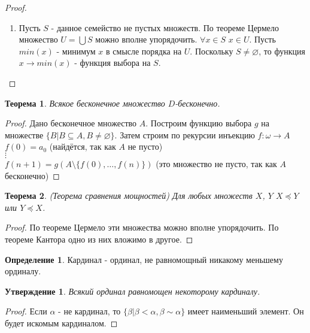 \documentclass[a4paper, 12pt]{article}
\theoremstyle{definition}
\newtheorem*{definition}{Определение}
\theoremstyle{plain}
\newtheorem*{theorem}{Теорема}
\newtheorem*{subtheorem}{Утверждение}
\theoremstyle{remark}
\begin{document}
\begin{proof}
\begin{enumerate}
      По лемме Цорна в $(W(X),\prec)$ найдётся максимальный элемент $(M,\leqslant_M)$. Если $M$ не совпадает с $X$, то возьмём $a\in X\setminus M$ и продолжим порядок $\leqslant_M$ на множество $N=M\cup\{a\}$, полагая $x\leqslant_N a$ $\forall x\in M$. Тогда $(N,\leqslant_N)$ - вполнеупорядоченное подмножество $X$ и $(M,\leqslant_M)\prec(N,\leqslant_N)$, что противоречит максимальности $(M\leqslant_M)$. Значит, $M$ совпадает с $X$ и $M$ вполне упорядочено. Теорема Цермело доказана.
      \item Пусть $S$ - данное семейство не пустых множеств. По теореме Цермело множество $U=\bigcup S$ можно вполне упорядочить. $\forall x\in S$ $x\in U$. Пусть $min(x)$ - минимум $x$ в смысле порядка на $U$. Поскольку $S\neq\varnothing$, то функция $x\to min(x)$ - функция выбора на $S$.
    \end{enumerate}
  \end{proof}
  \begin{theorem}
    Всякое бесконечное множество $D$-бесконечно.
  \end{theorem}
  \begin{proof}
    Дано бесконечное множество $A$. Построим функцию выбора $g$ на множестве $\{B|B\subseteq A, B\neq\varnothing\}$. Затем строим по рекурсии инъекцию $f:\omega\to A$\\
    $f(0)=a_0$ (найдётся, так как $A$ не пусто)\\
    $\vdots$\\
    $f(n+1)=g(A\setminus\{f(0),\ldots,f(n)\})$ (это множество не пусто, так как $A$ бесконечно)
  \end{proof}
  \begin{theorem} (Теорема сравнения мощностей)
    Для любых множеств $X$, $Y$ $X\preceq Y$ или $Y\preceq X$.
  \end{theorem}
  \begin{proof}
    По теореме Цермело эти множества можно вполне упорядочить. По теореме Кантора одно из них вложимо в другое.
  \end{proof}
  \begin{definition}
    Кардинал - ординал, не равномощный никакому меньшему ординалу.
  \end{definition}
  \begin{subtheorem}
    Всякий ординал равномощен некоторому кардиналу.
  \end{subtheorem}
  \begin{proof}
    Если $\alpha$ - не кардинал, то $\{\beta|\beta<\alpha,\beta\sim\alpha\}$ имеет наименьший элемент. Он будет искомым кардиналом.
  \end{proof}
\end{document}
